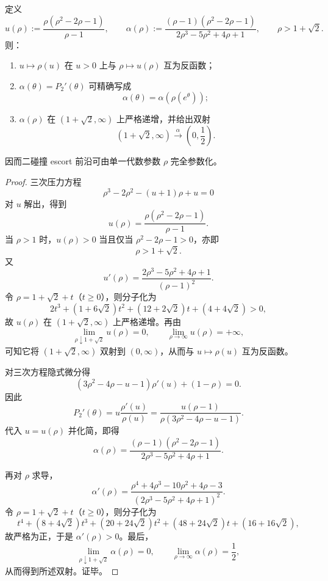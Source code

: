 \begin{theorem}\label{thm:conclusion-realinput40-collision-escort-algebraic-parametrization}
定义
\[
u(\rho):=\frac{\rho(\rho^2-2\rho-1)}{\rho-1},
\qquad
\alpha(\rho):=\frac{(\rho-1)(\rho^2-2\rho-1)}{2\rho^3-5\rho^2+4\rho+1},
\qquad
\rho>1+\sqrt2.
\]
则：
\begin{enumerate}
  \item \(u\mapsto \rho(u)\) 在 \(u>0\) 上与 \(\rho\mapsto u(\rho)\) 互为反函数；
  \item \(\alpha(\theta)=P_2'(\theta)\) 可精确写成
  \[
  \alpha(\theta)=\alpha(\rho(e^\theta));
  \]
  \item \(\alpha(\rho)\) 在 \((1+\sqrt2,\infty)\) 上严格递增，并给出双射
  \[
  (1+\sqrt2,\infty)\xrightarrow{\ \alpha\ }\left(0,\frac12\right).
  \]
\end{enumerate}
因而二碰撞 escort 前沿可由单一代数参数 \(\rho\) 完全参数化。
\end{theorem}
\begin{proof}
三次压力方程
\[
\rho^3-2\rho^2-(u+1)\rho+u=0
\]
对 \(u\) 解出，得到
\[
u(\rho)=\frac{\rho(\rho^2-2\rho-1)}{\rho-1}.
\]
当 \(\rho>1\) 时，\(u(\rho)>0\) 当且仅当 \(\rho^2-2\rho-1>0\)，亦即
\[
\rho>1+\sqrt2.
\]
又
\[
u'(\rho)=\frac{2\rho^3-5\rho^2+4\rho+1}{(\rho-1)^2}.
\]
令 \(\rho=1+\sqrt2+t\)（\(t\ge 0\)），则分子化为
\[
2t^3+(1+6\sqrt2)t^2+(12+2\sqrt2)t+(4+4\sqrt2)>0,
\]
故 \(u(\rho)\) 在 \((1+\sqrt2,\infty)\) 上严格递增。再由
\[
\lim_{\rho\downarrow 1+\sqrt2}u(\rho)=0,
\qquad
\lim_{\rho\to\infty}u(\rho)=+\infty,
\]
可知它将 \((1+\sqrt2,\infty)\) 双射到 \((0,\infty)\)，从而与 \(u\mapsto \rho(u)\) 互为反函数。

对三次方程隐式微分得
\[
(3\rho^2-4\rho-u-1)\rho'(u)+(1-\rho)=0.
\]
因此
\[
P_2'(\theta)
=
u\frac{\rho'(u)}{\rho(u)}
=
\frac{u(\rho-1)}{\rho(3\rho^2-4\rho-u-1)}.
\]
代入 \(u=u(\rho)\) 并化简，即得
\[
\alpha(\rho)=\frac{(\rho-1)(\rho^2-2\rho-1)}{2\rho^3-5\rho^2+4\rho+1}.
\]

再对 \(\rho\) 求导，
\[
\alpha'(\rho)
=
\frac{\rho^4+4\rho^3-10\rho^2+4\rho-3}{(2\rho^3-5\rho^2+4\rho+1)^2}.
\]
令 \(\rho=1+\sqrt2+t\)（\(t\ge 0\)），则分子化为
\[
t^4+(8+4\sqrt2)t^3+(20+24\sqrt2)t^2+(48+24\sqrt2)t+(16+16\sqrt2),
\]
故严格为正，于是 \(\alpha'(\rho)>0\)。最后，
\[
\lim_{\rho\downarrow 1+\sqrt2}\alpha(\rho)=0,
\qquad
\lim_{\rho\to\infty}\alpha(\rho)=\frac12,
\]
从而得到所述双射。证毕。
\end{proof}

